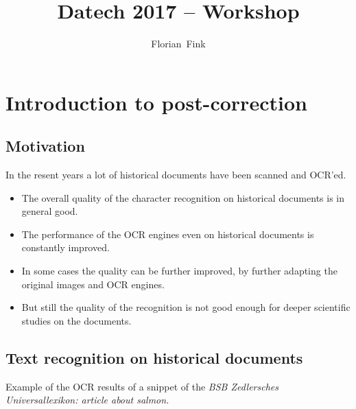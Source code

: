 
\title{Datech 2017 -- \pocoto{} Workshop}
\author{Florian~Fink}



\begin{frame}
	\titlepage
\end{frame}

\section{Introduction to post-correction}
\subsection{Motivation}
\begin{frame}
	In the resent years a lot of historical documents have been
	scanned and OCR'ed.

	\begin{itemize}
		\item The overall quality of the character recognition on historical
			documents is in general good.
		\item The performance of the OCR engines even on historical documents is
			constantly improved.
		\item In some cases the quality can be further improved, by further
			adapting the original images and OCR engines.
		\item But still the quality of the recognition is not good enough for
			deeper scientific studies on the documents.
	\end{itemize}
\end{frame}


\subsection{Text recognition on historical documents}
\begin{frame}
	Example of the OCR results of a snippet of the \emph{BSB Zedlersches
	Universallexikon: article about salmon.}
\end{frame}

